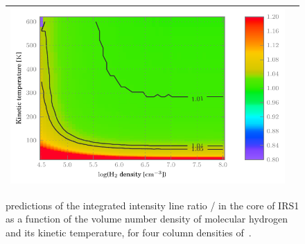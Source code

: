\begin{figure}
\begin{tabular}{cc}
\begin{minipage}{9.5cm}
            \includegraphics[width=\linewidth]{radex_grid_core_n190_t00273}
        \end{minipage}
        \\
        \bottomrule
    \end{tabular}%
    \caption{\Radex{} predictions of the integrated intensity line ratio / in the core of IRS1 as a function of the volume number density of molecular hydrogen and its kinetic temperature, for four column densities of~.}
    \label{fig:radex_core}
\end{figure}


